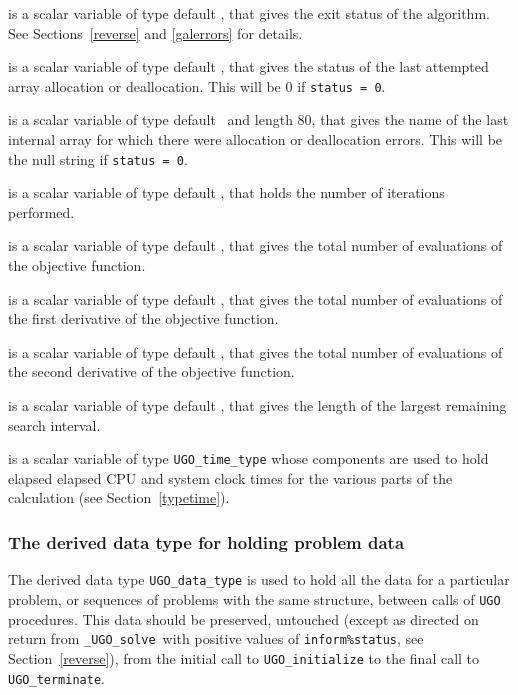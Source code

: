 \documentclass{galahad}
\newcommand{\packagename}{UGO}
\newcommand{\fullpackagename}{\libraryname\_\packagename}
\newcommand{\solver}{{\tt \fullpackagename\_solve}}
\begin{document}
\begin{description}
 is a scalar variable of type default \integer, that gives the
exit status of the algorithm.
See Sections~\ref{reverse} and \ref{galerrors} for details.

 is a scalar variable of type default \integer, that gives
the status of the last attempted array allocation or deallocation.
This will be 0 if {\tt status = 0}.

 is a scalar variable of type default \character\
and length 80, that  gives the name of the last internal array
for which there were allocation or deallocation errors.
This will be the null string if {\tt status = 0}.

 is a scalar variable of type default \integer, that holds the
number of iterations performed.

 is a scalar variable of type default \integer, that gives the
total number of evaluations of the objective function.

 is a scalar variable of type default \integer, that gives the
total number of evaluations of the first derivative of the objective function.

 is a scalar variable of type default \integer, that gives the
total number of evaluations of the second derivative of the objective function.

 is a scalar variable of type default \integer,
that gives the length of the largest remaining search interval.

 is a scalar variable of type {\tt \packagename\_time\_type}
whose components are used to hold elapsed elapsed CPU and system clock
times for the various parts of the calculation (see Section~\ref{typetime}).

\end{description}


\subsubsection{The derived data type for holding problem data}\label{typedata}
The derived data type
{\tt \packagename\_data\_type}
is used to hold all the data for a particular problem,
or sequences of problems with the same structure, between calls of
{\tt \packagename} procedures.
This data should be preserved, untouched (except as directed on
return from \solver\ with positive values of {\tt inform\%status}, see
Section~\ref{reverse}),
from the initial call to
{\tt \packagename\_initialize}
to the final call to
{\tt \packagename\_terminate}.
\end{document}

